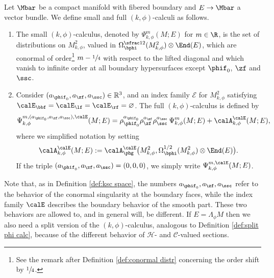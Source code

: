 \begin{defn}\label{def:psi k phi}
Let $\Mbar$ be a compact manifold with fibered boundary and $E\to\Mbar$ a vector bundle.
We define small and full $(k,\phi)$-calculi as follows.

\begin{enumerate}
\item
The small $(k,\phi)$-calculus, denoted by $\Psi_{k,\phi}^m(M;E)$
for $m\in\R$, is the set of distributions on $M^2_{k,\phi}$, valued in
$\Omega^{\sfrac12}_{\bphi}(M^{2}_{k, \phi}) \otimes \End(E)$,
which are conormal of order\footnote{See the remark after Definition \ref{def:conormal distr} concerning the order shift by $\sfrac14$.}
$m-\sfrac14$ with respect to the lifted diagonal
and which vanish to infinite order at all boundary hypersurfaces except $\phif_0$, $\zf$ and $\ssc$.

\item
Consider $(a_{\phif_0},a_{\zf},a_{\ssc}) \in \mathbb{R}^{3}$,
and an index family $\mathcal{E}$ for $M^{2}_{k, \phi}$ satisfying
$ \calE_{\bbf}=\calE_{\lf}=\calE_{\rf}=\varnothing$. The full $(k,\phi)$-calculus is defined by
\begin{equation}
\Psi_{k,\phi}^{m,(a_{\phif_0}, a_\zf,a_\ssc),\calE}(M;E) =
\rho_{\phif_0}^{a_{\phif_0}}\rho_\zf^{a_\zf}\rho_\ssc^{a_\ssc}\,\Psi_{k,\phi}^m(M;E) + \calA^{\calE}_{k,\phi}(M;E),
\end{equation}
where we simplified notation by setting
\begin{equation*}
\calA^{\calE}_{k,\phi}(M;E):= \calA_{\phg}^\calE \bigl(M^{2}_{k, \phi},
\Omega^{1/2}_{\bphi} (M^{2}_{k, \phi})
\otimes \End(E)\bigr).
\end{equation*}
If the triple $(a_{\phif_0}, a_\zf,a_\ssc) = (0,0,0)$, we simply write $\Psi_{k,\phi}^{m,\calE}(M;E)$.
\end{enumerate}
\end{defn}

Note that, as in Definition \ref{def:ksc space}, the numbers $a_{\phif_0}, a_\zf,a_\ssc$ refer to the behavior of the
conormal singularity at the boundary faces, while the index family $\calE$ describes the boundary behavior
of the smooth part. These two behaviors are allowed to, and in general will, be different.
If $E=\Lambda_\phi M$ then
we also need a split version of the $(k,\phi)$-calculus, analogous to Definition \ref{def:split phi calc},
because of the different behavior of $\mathscr{H}$\nobreakdash- and $\mathscr{C}$-valued sections.

